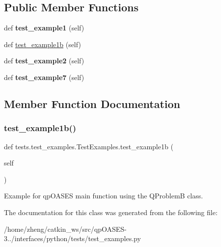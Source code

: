\subsection*{Public Member Functions}
\begin{DoxyCompactItemize}
\item 
\mbox{\label{classtests_1_1test__examples_1_1_test_examples_a89c93fe0991f374517780247c924d5d1}} 
def {\bfseries test\+\_\+example1} (self)
\item 
def \hyperlink{classtests_1_1test__examples_1_1_test_examples_a82749881bb9ef0d03dd5fa453f9cee61}{test\+\_\+example1b} (self)
\item 
\mbox{\label{classtests_1_1test__examples_1_1_test_examples_a140fce3f95432c3e6c801ec7f273b248}} 
def {\bfseries test\+\_\+example2} (self)
\item 
\mbox{\label{classtests_1_1test__examples_1_1_test_examples_aad972002d38d62e564ecccb16b573dab}} 
def {\bfseries test\+\_\+example7} (self)
\end{DoxyCompactItemize}


\subsection{Member Function Documentation}
\mbox{\label{classtests_1_1test__examples_1_1_test_examples_a82749881bb9ef0d03dd5fa453f9cee61}} 
\subsubsection{\texorpdfstring{test\+\_\+example1b()}{test\_example1b()}}
{\footnotesize\ttfamily def tests.\+test\+\_\+examples.\+Test\+Examples.\+test\+\_\+example1b (\begin{DoxyParamCaption}\item[{}]{self }\end{DoxyParamCaption})}

\begin{DoxyVerb}Example for qpOASES main function using the QProblemB class.\end{DoxyVerb}
 

The documentation for this class was generated from the following file\+:\begin{DoxyCompactItemize}
\item 
/home/zheng/catkin\+\_\+ws/src/qp\+O\+A\+S\+E\+S-\/3../interfaces/python/tests/test\+\_\+examples.\+py\end{DoxyCompactItemize}
